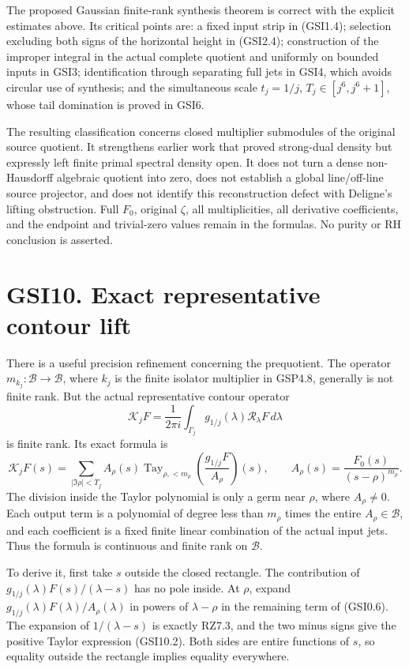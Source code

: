 The proposed Gaussian finite-rank synthesis theorem is correct with the
explicit estimates above. Its critical points are: a fixed input strip
in (GSI1.4); selection excluding both signs of the horizontal height in
(GSI2.4); construction of the improper integral in the actual complete
quotient and uniformly on bounded inputs in GSI3; identification through
separating full jets in GSI4, which avoids circular use of synthesis;
and the simultaneous scale \(t_j=1/j\), \(T_j\in[j^6,j^6+1]\), whose
tail domination is proved in GSI6.

The resulting classification concerns closed multiplier submodules of
the original source quotient. It strengthens earlier work that proved
strong-dual density but expressly left finite primal spectral density
open. It does not turn a dense non-Hausdorff algebraic quotient into
zero, does not establish a global line/off-line source projector, and
does not identify this reconstruction defect with Deligne's lifting
obstruction. Full \(F_0\), original \(\zeta\), all multiplicities, all
derivative coefficients, and the endpoint and trivial-zero values remain
in the formulas. No purity or RH conclusion is asserted.

\section{GSI10. Exact representative contour
lift}\label{gsi10.-exact-representative-contour-lift}

There is a useful precision refinement concerning the prequotient. The
operator \(m_{k_j}:\mathcal B\to\mathcal B\), where \(k_j\) is the
finite isolator multiplier in GSP4.8, generally is not finite rank. But
the actual representative contour operator \[
\mathscr K_jF=\frac1{2\pi i}\int_{\Gamma_j}
g_{1/j}(\lambda)\mathscr R_\lambda F\,d\lambda
\tag{GSI10.1}
\] is finite rank. Its exact formula is \[
\mathscr K_jF(s)=\sum_{|\Im\rho|<T_j}
A_\rho(s)\operatorname{Tay}_{\rho,<m_\rho}
\left(\frac{g_{1/j}F}{A_\rho}\right)(s),
\qquad A_\rho(s)=\frac{F_0(s)}{(s-\rho)^{m_\rho}}.
\tag{GSI10.2}
\] The division inside the Taylor polynomial is only a germ near
\(\rho\), where \(A_\rho\ne0\). Each output term is a polynomial of
degree less than \(m_\rho\) times the entire \(A_\rho\in\mathcal B\),
and each coefficient is a fixed finite linear combination of the actual
input jets. Thus the formula is continuous and finite rank on
\(\mathcal B\).

To derive it, first take \(s\) outside the closed rectangle. The
contribution of \(g_{1/j}(\lambda)F(s)/(\lambda-s)\) has no pole inside.
At \(\rho\), expand \(g_{1/j}(\lambda)F(\lambda)/A_\rho(\lambda)\) in
powers of \(\lambda-\rho\) in the remaining term of (GSI0.6). The
expansion of \(1/(\lambda-s)\) is exactly RZ7.3, and the two minus signs
give the positive Taylor expression (GSI10.2). Both sides are entire
functions of \(s\), so equality outside the rectangle implies equality
everywhere.

